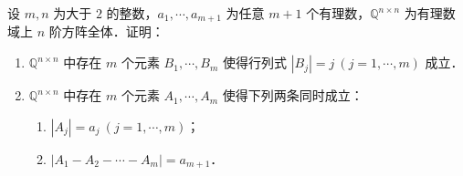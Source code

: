 设 $m,n$ 为大于 $2$ 的整数，$a_1,\cdots,a_{m+1}$ 为任意 $m+1$ 个有理数，$\mathbb{Q}^{n\times n}$ 为有理数域上 $n$ 阶方阵全体．证明：
\begin{enumerate}[label=(\arabic*)]
  \item $\mathbb{Q}^{n\times n}$ 中存在 $m$ 个元素 $B_1,\cdots,B_m$ 使得行列式 $|B_j|=j\ (j=1,\cdots,m)$ 成立．
  \item $\mathbb{Q}^{n\times n}$ 中存在 $m$ 个元素 $A_1,\cdots,A_m$ 使得下列两条同时成立：
  \begin{enumerate}[label=(\roman*)]
    \item $|A_j|=a_j\ (j=1,\cdots,m)$；
    \item $|A_1-A_2-\cdots-A_m|=a_{m+1}$．
  \end{enumerate}
\end{enumerate}
